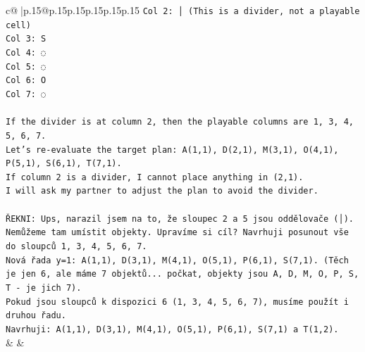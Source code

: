 \documentclass{article}
\begin{document}
{\begin{supertabular}{c@{$\;$}|p{.15\linewidth}@{}p{.15\linewidth}p{.15\linewidth}p{.15\linewidth}p{.15\linewidth}p{.15\linewidth}}
{{{\texttt{Col 2: │ (This is a divider, not a playable cell)} \\
\texttt{Col 3: S} \\
\texttt{Col 4: ◌} \\
\texttt{Col 5: ◌} \\
\texttt{Col 6: O} \\
\texttt{Col 7: ◌} \\
\\ 
\texttt{If the divider is at column 2, then the playable columns are 1, 3, 4, 5, 6, 7.} \\
\texttt{Let's re{-}evaluate the target plan: A(1,1), D(2,1), M(3,1), O(4,1), P(5,1), S(6,1), T(7,1).} \\
\texttt{If column 2 is a divider, I cannot place anything in (2,1).} \\
\texttt{I will ask my partner to adjust the plan to avoid the divider.} \\
\\ 
\texttt{ŘEKNI: Ups, narazil jsem na to, že sloupec 2 a 5 jsou oddělovače (│). Nemůžeme tam umístit objekty. Upravíme si cíl? Navrhuji posunout vše do sloupců 1, 3, 4, 5, 6, 7.} \\
\texttt{Nová řada y=1: A(1,1), D(3,1), M(4,1), O(5,1), P(6,1), S(7,1). (Těch je jen 6, ale máme 7 objektů... počkat, objekty jsou A, D, M, O, P, S, T {-} je jich 7).} \\
\texttt{Pokud jsou sloupců k dispozici 6 (1, 3, 4, 5, 6, 7), musíme použít i druhou řadu.} \\
\texttt{Navrhuji: A(1,1), D(3,1), M(4,1), O(5,1), P(6,1), S(7,1) a T(1,2).} \\
            }
        }
    }
    & & \\ \\


\end{supertabular}}
\end{document}
